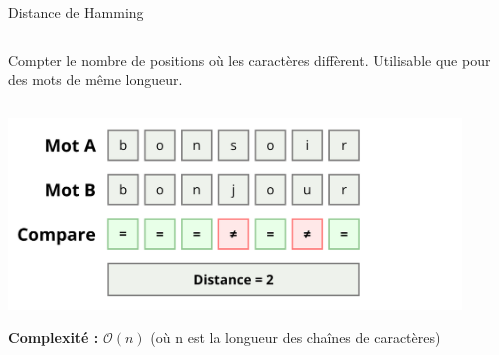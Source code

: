 \begin{frame}{Distance de Hamming}
	\begin{columns}
		Compter le nombre de positions où les caractères diffèrent.
		Utilisable que pour des mots de même longueur.
	\end{columns}
	\begin{center}
		\includegraphics[width=0.9\textwidth]{images/hamming.png}
	\end{center}
	\textbf{Complexité : }  $\mathcal{O}(n)$ (où n est la longueur des chaînes de caractères)
\end{frame}
